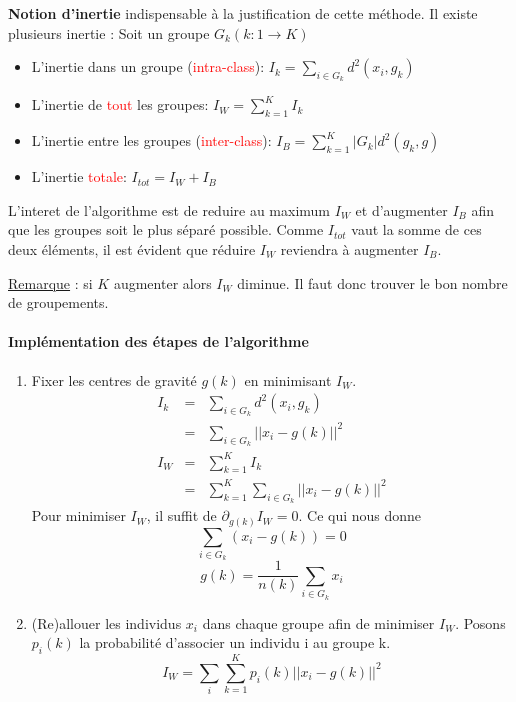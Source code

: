 \documentclass[a4paper, 11pt, onecolumn]{article}
\begin{document}
\begin{enumerate}
\begin{framed}
  \textbf{Notion d'inertie} indispensable à la justification de cette méthode. Il existe plusieurs
  inertie :
Soit un groupe $G_k (k: 1\rightarrow K)$
\begin{itemize}
  \item L'inertie dans un groupe (\textcolor{red}{intra-class}): $I_k = \sum_{i \in G_k}d^2(x_i,g_k)$
  \item L'inertie de \textcolor{red}{tout} les groupes: $I_W = \sum_{k=1}^{K} I_k$
  \item L'inertie entre les groupes (\textcolor{red}{inter-class}): $I_B = \sum_{k=1}^{K}|G_k|d^2(g_k,g)$
  \item L'inertie \textcolor{red}{totale}: $I_{tot} = I_W + I_B$
\end{itemize}
\end{framed}

L'interet de l'algorithme est de reduire au maximum $I_W$ et d'augmenter $I_B$ afin que les groupes soit le plus séparé possible. 
Comme $I_{tot}$ vaut la somme de ces deux éléments, il est évident que réduire $I_W$ reviendra à augmenter $I_B$.

\underline{Remarque} : si $K$ augmenter alors $I_W$ diminue. Il faut donc trouver le bon nombre de groupements. 

\paragraph{Implémentation des étapes de l'algorithme}
\begin{enumerate}
\item Fixer les centres de gravité $g(k)$ en minimisant $I_W$. 
\begin{eqnarray}
I_k &=& \sum_{i \in G_k}d^2(x_i,g_k)\\
    &=& \sum_{i \in G_k}||x_i - g(k)||^2 \\
I_W &=& \sum_{k=1}^K I_k \\
&=& \sum_{k=1}^K \sum_{i \in G_k}||x_i - g(k)||^2 
\end{eqnarray}
Pour minimiser $I_W$, il suffit de $\partial_{g(k)}I_W = 0$. Ce qui nous donne
$$\sum_{i \in G_k}(x_i - g(k)) = 0$$
$$g(k) = \frac{1}{n(k)}\sum_{i \in G_k}x_i$$

\item (Re)allouer les individus $x_i$ dans chaque groupe afin de minimiser $I_W$. Posons $p_i(k)$ la probabilité d'associer un individu i au groupe k.
$$I_W = \sum_i \sum_{k=1}^{K} p_i(k) ||x_i - g(k)||^2$$


\end{enumerate}
\end{enumerate}
\end{document}

